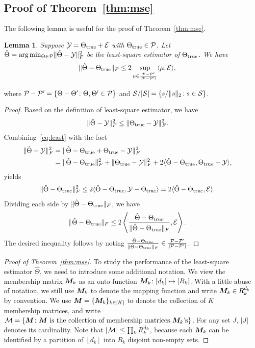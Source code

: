 \documentclass{article}
\newtheorem{lemma}{Lemma}
\begin{document}
\begin{appendices}
\subsection{Proof of Theorem~\ref{thm:mse}}
The following lemma is useful for the proof of Theorem~\ref{thm:mse}.
\begin{lemma} \label{lem:high}
Suppose $\mathcal{Y}=\Theta_{\text{true}}+\mathcal{E}$ with $\Theta_{\text{true}}\in\mathcal{P}$. Let $\hat \Theta=\arg\min_{\Theta \in \mathcal{P}}\lVert\hat \Theta-\mathcal{Y}\rVert_F^2$ be the least-square estimator of $\Theta_{\text{true}}$. We have
\[
\lVert\hat \Theta-\Theta_{\text{true}}\rVert_F\leq 2\sup_{\mu \in { \mathcal{P}-\mathcal{P}'\over |\mathcal{P}-\mathcal{P}'|}}\langle \mu, \mathcal{E} \rangle,
\]
\end{lemma}
where $\mathcal{P}-\mathcal{P}'=\{\Theta-\Theta'\colon \Theta, \Theta'\in \mathcal{P}\}$ and $\mathcal{S}/|\mathcal{S}|=\{s/\lVert s\rVert_2\colon s\in \mathcal{S}\}$.
\begin{proof} Based on the definition of least-square estimator, we have
\begin{equation}\label{eq:least}
\lVert\hat \Theta-\mathcal{Y}\rVert_F^2\leq \lVert\Theta_{\text{true}}-\mathcal{Y}\rVert_F^2.
\end{equation}
Combining~\eqref{eq:least} with the fact 
\begin{equation}
\begin{split}
\lVert\hat \Theta -\mathcal{Y}\rVert_F^2&=\lVert\hat \Theta-\Theta_{\text{true}}+\Theta_{\text{true}}-\mathcal{Y}\rVert_F^2\\
&=\lVert\hat \Theta-\Theta_{\text{true}}\rVert_F^2+\lVert\Theta_{\text{true}}-\mathcal{Y}\rVert_F^2+2\langle \hat \Theta-\Theta_{\text{true}}, \Theta_{\text{true}}-\mathcal{Y}\rangle,
\end{split}
\end{equation}
yields
\[
\lVert\hat \Theta-\Theta_{\text{true}}\rVert_F^2\leq 2\langle \hat \Theta-\Theta_{\text{true}}, \mathcal{Y}-\Theta_{\text{true}}\rangle=2\langle \hat \Theta-\Theta_{\text{true}}, \mathcal{E}\rangle.
\]
Dividing each side by $\lVert\hat \Theta-\Theta_{\text{true}}\rVert_F$, we have
\[
\lVert\hat \Theta-\Theta_{\text{true}}\rVert_F\leq 2\left \langle {\hat \Theta-\Theta_{\text{true}}\over \lVert\hat \Theta-\Theta_{\text{true}}\rVert_F}, \mathcal{E}\right \rangle.
\]
The desired inequality follows by noting ${\hat \Theta-\Theta_{\text{true}} \over \lVert\hat \Theta-\Theta_{\text{true}}\rVert_F}\in {\mathcal{P}-\mathcal{P}'\over |\mathcal{P}-\mathcal{P}'|}$. 
\end{proof}


\begin{proof}[Proof of Theorem~\ref{thm:mse}]
To study the performance of the least-square estimator $\hat \Theta$, we need to introduce some additional notation. We view the membership matrix $\bm M_k$ as an onto function $\bm M_k\colon [d_k]\mapsto [R_k]$. With a little abuse of notation, we still use $\bm M_k$ to denote the mapping function and write $\bm M_k\in R_k^{d_k}$ by convention. We use $\bm M=\{\bm M_k\}_{k\in[K]}$ to denote the collection of $K$ membership matrices, and write $\mathcal{M}=\{\bm M \colon \text{$\bm M$ is the collection of membership matrices $\bm M_k$'s}\}$. For any set $J$, $|J|$ denotes its cardinality. Note that $|\mathcal{M}|\leq \prod_k R_k^{d_k}$, because each $\bm M_k$ can be identified by a partition of $[d_k]$ into $R_k$ disjoint non-empty sets. 


\end{proof}
\end{appendices}
\end{document}
